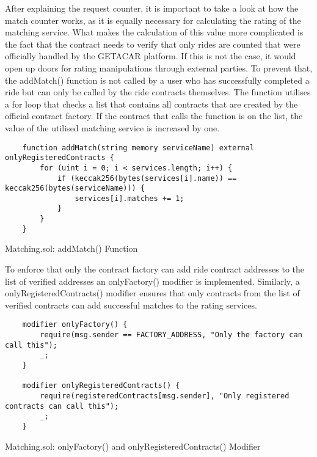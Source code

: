 After explaining the request counter, it is important to take a look at how the match counter works, as it is equally necessary for calculating the rating of the matching service. What makes the calculation of this value more complicated is the fact that the contract needs to verify that only rides are counted that were officially handled by the GETACAR platform. If this is not the case, it would open up doors for rating manipulations through external parties. To prevent that, the addMatch() function is not called by a user who has successfully completed a ride but can only be called by the ride contracts themselves. The function utilises a for loop that checks a list that contains all contracts that are created by the official contract factory. If the contract that calls the function is on the list, the value of the utilised matching service is increased by one.

\lstset{
  basicstyle=\footnotesize\ttfamily,
  breaklines=true,
  numbers=left,
  firstnumber=81
}

\begin{Listing}
\begin{lstlisting}
    function addMatch(string memory serviceName) external onlyRegisteredContracts {
        for (uint i = 0; i < services.length; i++) {
            if (keccak256(bytes(services[i].name)) == keccak256(bytes(serviceName))) {
                services[i].matches += 1;
            }
        }
    }
\end{lstlisting}
  \caption{Matching.sol: addMatch() Function}
  \label{lst:addMatch}
\end{Listing}

To enforce that only the contract factory can add ride contract addresses to the list of verified addresses an onlyFactory() modifier is implemented. Similarly, a onlyRegisteredContracts() modifier ensures that only contracts from the list of verified contracts can add successful matches to the rating services.

\lstset{
  basicstyle=\footnotesize\ttfamily,
  breaklines=true,
  numbers=left,
  firstnumber=24
}

\begin{Listing}
\begin{lstlisting}
    modifier onlyFactory() {
        require(msg.sender == FACTORY_ADDRESS, "Only the factory can call this");
        _;
    }

    modifier onlyRegisteredContracts() {
        require(registeredContracts[msg.sender], "Only registered contracts can call this");
        _;
    }
\end{lstlisting}
  \caption{Matching.sol: onlyFactory() and onlyRegisteredContracts() Modifier}
  \label{lst:modifier}
\end{Listing}







